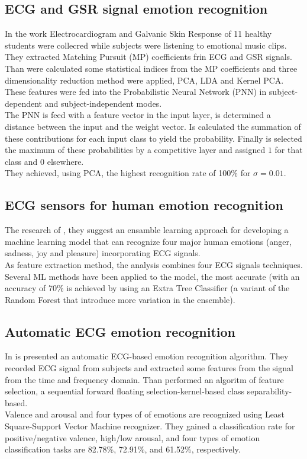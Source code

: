 \subsection{ECG and GSR signal emotion recognition}
In the work \cite{goshvarpour2017accurate} Electrocardiogram and Galvanic Skin Response of 11 healthy students were collecred while subjects were listening to emotional music clips. They extracted Matching Pursuit (MP) coefficients frin ECG and GSR signals.
\\ \indent
Than were calculated some statistical indices from the MP coefficients and three dimensionality reduction method were applied, PCA, LDA and Kernel PCA. These features were fed into the Probabilistic Neural Network (PNN) in subject-dependent and subject-independent modes.
\\ \indent
The PNN is feed with a feature vector in the input layer, is determined a distance between the input and the weight vector. Is calculated the summation of these contributions for each input class to yield the probability. Finally is selected the maximum of these probabilities by a competitive layer and assigned $1$ for that class and $0$ elsewhere.
\\ \indent
They achieved, using PCA, the highest recognition rate of 100\% for $\sigma = 0.01$.

\subsection{ECG sensors for human emotion recognition}
The research of \cite{dissanayake2019ensemble}, they suggest an ensamble learning approach for developing a machine learning model that can recognize four major human emotions (anger, sadness, joy and pleasure) incorporating ECG signals.
\\ \indent
As feature extraction method, the analysis combines four ECG signals techniques. Several ML methods have been applied to the model, the most accurate (with an accuracy of 70\% is achieved by using an Extra Tree Classifier (a variant of the Random Forest that introduce more variation in the ensemble).

\subsection{Automatic ECG emotion recognition}
In \cite{hsu2017automatic} is presented an automatic ECG-based emotion recognition algorithm. They recorded ECG signal from subjects and extracted some features from the signal from the time and frequency domain. Than performed an algoritm of feature selection, a sequential forward floating selection-kernel-based class separability-based.
\\
Valence and arousal and four types of of emotions are recognized using Least Square-Support Vector Machine recognizer. They gained a classification rate for positive/negative valence, high/low arousal, and four types of emotion classification tasks are 82.78\%, 72.91\%, and 61.52\%, respectively.

